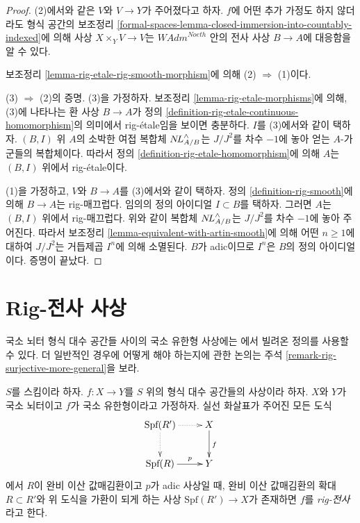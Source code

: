 \begin{proof}
(2)에서와 같은 $V$와 $V \to Y$가 주어졌다고 하자.
$f$에 어떤 추가 가정도 하지 않더라도 형식 공간의 보조정리
\ref{formal-spaces-lemma-closed-immersion-into-countably-indexed}에 의해
사상 $X \times_Y V \to V$는 $\textit{WAdm}^{Noeth}$ 안의 전사 사상
$B \to A$에 대응함을 알 수 있다.

\medskip\noindent
보조정리 \ref{lemma-rig-etale-rig-smooth-morphism}에 의해
(2) $\Rightarrow$ (1)이다.

\medskip\noindent
(3) $\Rightarrow$ (2)의 증명. (3)을 가정하자. 보조정리
\ref{lemma-rig-etale-morphisms}에 의해, (3)에 나타나는 환 사상
$B \to A$가 정의 \ref{definition-rig-etale-continuous-homomorphism}의
의미에서 rig-\'etale임을 보이면 충분하다. $I$를 (3)에서와 같이 택하자.
$(B, I)$ 위 $A$의 소박한 여접 복합체 $\mathop{N\!L}\nolimits_{A/B}^\wedge$는
$J/J^2$를 차수 $-1$에 놓아 얻는 $A$-가군들의 복합체이다.
따라서 정의 \ref{definition-rig-etale-homomorphism}에 의해
$A$는 $(B, I)$ 위에서 rig-\'etale이다.

\medskip\noindent
(1)을 가정하고, $V$와 $B \to A$를 (3)에서와 같이 택하자.
정의 \ref{definition-rig-smooth}에 의해 $B \to A$는 rig-매끄럽다.
임의의 정의 아이디얼 $I \subset B$를 택하자.
그러면 $A$는 $(B, I)$ 위에서 rig-매끄럽다.
위와 같이 복합체 $\mathop{N\!L}\nolimits_{A/B}^\wedge$는 $J/J^2$를 차수 $-1$에
놓아 주어진다. 따라서 보조정리 \ref{lemma-equivalent-with-artin-smooth}에 의해
어떤 $n \geq 1$에 대하여 $J/J^2$는 거듭제곱 $I^n$에 의해 소멸된다.
$B$가 adic이므로 $I^n$은 $B$의 정의 아이디얼이다. 증명이 끝났다.
\end{proof}


\section{Rig-전사 사상}
\label{section-rig-surjective}

\noindent
국소 뇌터 형식 대수 공간들 사이의 국소 유한형 사상에는
\cite{ArtinII}에서 빌려온 정의를 사용할 수 있다. 더 일반적인 경우에
어떻게 해야 하는지에 관한 논의는 주석
\ref{remark-rig-surjective-more-general}을 보라.

\begin{definition}
\label{definition-rig-surjective}
$S$를 스킴이라 하자. $f : X \to Y$를 $S$ 위의 형식 대수 공간들의
사상이라 하자. $X$와 $Y$가 국소 뇌터이고 $f$가 국소 유한형이라고
가정하자. 실선 화살표가 주어진 모든 도식
$$
\xymatrix{
\text{Spf}(R') \ar@{..>}[r] \ar@{..>}[d] & X \ar[d]^f \\
\text{Spf}(R) \ar[r]^-p & Y
}
$$
에서 $R$이 완비 이산 값매김환이고 $p$가 adic 사상일 때,
완비 이산 값매김환의 확대 $R \subset R'$와 위 도식을 가환이 되게 하는
사상 $\text{Spf}(R') \to X$가 존재하면 $f$를 {\it rig-전사}라고 한다.
\end{definition}

